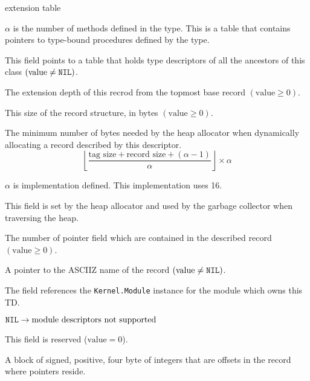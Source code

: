 \begin{TDfields}{extension table}
\item[method] $\alpha$ is the number of methods defined in the type.
  This is a table that contains pointers to type-bound procedures
  defined by the type.

  \item[flags] 

  \item[extension table] This field points to a table that holds type
    descriptors of all the ancestors of this class $(\textrm{value}
    \neq \texttt{NIL})$.

  \item[extension level]  The extension depth of this recrod from the
    topmost base record $(\textrm{value} \geq 0)$.

  \item[record size] This size of the record structure, in bytes
    $(\textrm{value} \geq 0)$.

  \item[block size] The minimum number of bytes needed by the heap
    allocator when dynamically allocating a record described by this
    descriptor.
    $$\left\lfloor\frac{\textrm{tag size} + \textrm{record size} +
      (\alpha - 1)}{\alpha}\right\rfloor \times \alpha$$

    $\alpha$ is implementation defined.  This implementation uses 16.

    This field is set by the heap allocator and used by the garbage
    collector when traversing the heap.

  \item[pointer count] The number of pointer field which are contained
    in the described record $(\textrm{value} \geq 0)$.

  \item[record name] A pointer to the ASCIIZ name of the record
    $(\textrm{value} \neq \texttt{NIL})$.

  \item[module desc]
    The field references the \texttt{Kernel.Module} instance for the
    module which owns this TD.

     $\texttt{NIL} \rightarrow \textrm{module descriptors not supported}$

  \item[finalization] This field is reserved ($\textrm{value} = 0$).

  \item[pointer offsets] A block of signed, positive, four byte of
    integers that are offsets in the record where pointers reside.


\end{TDfields}
